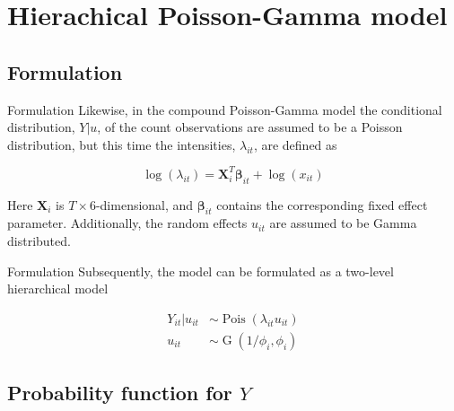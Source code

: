 \documentclass[aspectratio=169]{beamer}
\DeclareMathOperator{\G}{G}
\DeclareMathOperator{\Pois}{Pois}
\begin{document}
\hypertarget{hierachical-poisson-gamma-model}{%
\section{Hierachical Poisson-Gamma
model}\label{hierachical-poisson-gamma-model}}

\hypertarget{formulation-1}{%
\subsection{Formulation}\label{formulation-1}}

\begin{frame}{Formulation}
Likewise, in the compound Poisson-Gamma model the conditional
distribution, \(Y|u\), of the count observations are assumed to be a
Poisson distribution, but this time the intensities, \(\lambda_{it}\),
are defined as

\begin{equation}
  \log(\lambda_{it})=\mathbf{X}_i^T\mathbf{\beta}_{it}+\log(x_{it})
\end{equation}

Here \(\mathbf{X}_i\) is \(T\times6\)-dimensional, and
\(\mathbf{\beta}_{it}\) contains the corresponding fixed effect
parameter. Additionally, the random effects \(u_{it}\) are assumed to be
Gamma distributed.
\end{frame}

\begin{frame}{Formulation}
\protect\hypertarget{formulation-2}{}
Subsequently, the model can be formulated as a two-level hierarchical
model

\begin{subequations} \label{eq:PoisGam}
  \begin{alignat}{2}
    Y_{it}|u_{it} &\sim \Pois (\lambda_{it}u_{it}) \label{eq:pois_g0} \\ 
    u_{it} &\sim \G(1/\phi_{i},\phi_{i}) \label{eq:pois_g1}
  \end{alignat}
\end{subequations}
\end{frame}

\hypertarget{probability-function-for-y}{%
\subsection{\texorpdfstring{Probability function for
\(Y\)}{Probability function for Y}}\label{probability-function-for-y}}
\end{document}

